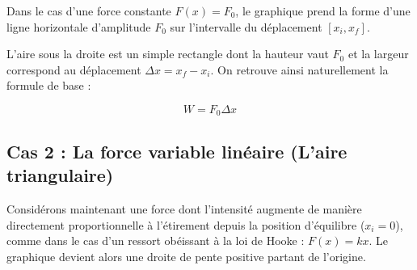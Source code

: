 \documentclass[11pt,openany]{book}
\begin{document}
Dans le cas d'une force constante $F(x) = F_0$, le graphique prend la forme d'une ligne horizontale d'amplitude $F_0$ sur l'intervalle du déplacement $[x_i, x_f]$.

\begin{center}
\end{center}
L'aire sous la droite est un simple rectangle dont la hauteur vaut $F_0$ et la largeur correspond au déplacement $\Delta x = x_f - x_i$. On retrouve ainsi naturellement la formule de base :

\[
W = F_0 \Delta x
\]

\subsection{Cas 2 : La force variable linéaire (L'aire triangulaire)}

Considérons maintenant une force dont l'intensité augmente de manière directement proportionnelle à l'étirement depuis la position d'équilibre ($x_i = 0$), comme dans le cas d'un ressort obéissant à la loi de Hooke : $F(x) = kx$. Le graphique devient alors une droite de pente positive partant de l'origine.
\end{document}
